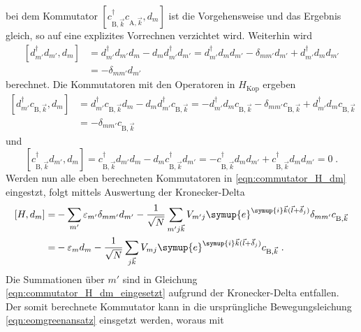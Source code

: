 bei dem Kommutator $\left [ c^\dagger_{\text{B},\vec{k}} c_{\text{A},\vec{k}}, d_m \right ]$ ist die Vorgehensweise und das Ergebnis gleich,
so auf eine explizites Vorrechnen verzichtet wird.
Weiterhin wird 
\begin{align*}
    \left [ d^\dagger_{m'} d_{m'}, d_{m} \right ] &= d^\dagger_{m'} d_{m'} d_{m} - d_{m} d^\dagger_{m'} d_{m'}  =
    d^\dagger_{m'} d_{m} d_{m'} - \delta_{mm'} d_{m'} +  d^\dagger_{m'} d_{m} d_{m'} \\
    &= - \delta_{mm'} d_{m'}
\end{align*} 
berechnet.
Die Kommutatoren mit den Operatoren in $H_\text{Kop}$ ergeben 
\begin{align*}
    \left [d^\dagger_{m'} c_{\text{B},\vec{k}}, d_m \right ] &= d^\dagger_{m'} c_{\text{B},\vec{k}} d_m -d_m d^\dagger_{m'}c_{\text{B}, \vec{k}} 
    = - d^\dagger_{m'} d_m c_{\text{B},\vec{k}} - \delta_{mm'} c_{\text{B},\vec{k}} + d^\dagger_{m'} d_m c_{\text{B},\vec{k}} \\
    &= - \delta_{mm'} c_{\text{B},\vec{k}}
\end{align*}
und 
\begin{equation}
    \left [c^\dagger_{\text{B},\vec{k}} d_{m'},  d_m \right ] = c^\dagger_{\text{B},\vec{k}} d_{m'} d_m - d_m c^\dagger_{\text{B},\vec{k}} d_{m'} 
    = - c^\dagger_{\text{B},\vec{k}} d_{m} d_{m'} + c^\dagger_{\text{B},\vec{k}} d_m  d_{m'} = 0 \; . \label{eqn:commutatornulldagger}
\end{equation}
Werden nun alle eben berechneten Kommutatoren in \eqref{eqn:commutator_H_dm} eingestzt, folgt mittels Auswertung der Kronecker-Delta
\begin{equation}
    \begin{split}
        [H, d_m] =& -\sum_{m'} \varepsilon_{m'} \delta_{mm'} d_{m'} - 
        \frac{1}{\sqrt{N}} \sum_{m'j\vec{k}} V_{m'j} \symup{e}^{\symup{i}\vec{k} (\vec{l} + \vec{\delta}_j)}  \delta_{mm'} c_{\text{B}, \vec{k}} \\
        = &- \varepsilon_m d_m - \frac{1}{\sqrt{N}} \sum_{j\vec{k}} V_{mj} \symup{e}^{\symup{i}\vec{k} (\vec{l} + \vec{\delta}_j)} c_{\text{B}, \vec{k}} \; .
        \label{eqn:commutator_H_dm_eingesetzt}
    \end{split}
\end{equation}
Die Summationen über $m'$ sind in Gleichung \eqref{eqn:commutator_H_dm_eingesetzt} aufgrund der Kronecker-Delta entfallen.
Der somit berechnete Kommutator kann in die ursprüngliche Bewegungsleichung \eqref{eqn:eomgreenansatz} einsgetzt werden, woraus mit 

